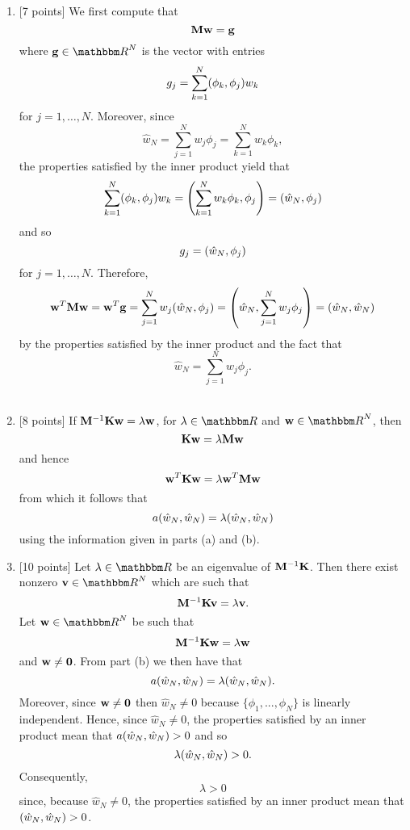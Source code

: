 \begin{solution}
\begin{enumerate}
\item {[7 points]} We first compute that
\[
{\bf M}{\bf w}={\bf g}
\]
where $\Bg\in\R^{N}$ is the vector with entries
\[
g_j=\sum_{k=1}^N(\phi_k,\phi_j)w_k
\]
for $j=1,\ldots,N$. Moreover, since
\[
\hat{w}_N=\sum_{j=1}^Nw_j\phi_j=\sum_{k=1}^Nw_k\phi_k,
\]
the properties satisfied by the inner product yield that
\[
\sum_{k=1}^N(\phi_k,\phi_j)w_k=\left(\sum_{k=1}^Nw_k\phi_k,\phi_j\right)=(\hat{w}_N,\phi_j)
\]
and so
\[
g_j=(\hat{w}_N,\phi_j)
\]
for $j=1,\ldots,N$. Therefore,
\[
{\bf w}^T{\bf M}{\bf w}={\bf w}^T{\bf g}=\sum_{j=1}^Nw_j(\hat{w}_N,\phi_j)=\left(\hat{w}_N,\sum_{j=1}^Nw_j\phi_j\right)=(\hat{w}_N,\hat{w}_N)
\]
by the properties satisfied by the inner product and the fact that
\[
\hat{w}_N=\sum_{j=1}^Nw_j\phi_j.
\]
\\
\item {[8 points]} If ${\bf M}^{-1}{\bf K}{\bf w}=\lambda{\bf w}$, for $\lambda\in\R$ and $\Bw\in\R^N$, then
\[
{\bf K}{\bf w}=\lambda{\bf M}{\bf w}
\]
and hence
\[
{\bf w}^T{\bf K}{\bf w}=\lambda{\bf w}^T{\bf M}{\bf w}
\]
from which it follows that
\[
a(\hat{w}_N,\hat{w}_N)=\lambda(\hat{w}_N,\hat{w}_N)
\]
using the information given in parts (a) and (b).
\\
\item {[10 points]} Let $\lambda\in\R$ be an eigenvalue of ${\bf M}^{-1}{\bf K}$. Then there exist nonzero $\Bv\in\R^N$ which are such that
\[
{\bf M}^{-1}{\bf K}{\bf v}=\lambda{\bf v}.
\]
Let $\Bw\in\R^N$ be such that
\[
{\bf M}^{-1}{\bf K}{\bf w}=\lambda{\bf w}
\]
and ${\bf w}\ne{\bf 0}$. From part (b) we then have that
\[
a(\hat{w}_N,\hat{w}_N)=\lambda(\hat{w}_N,\hat{w}_N).
\]
Moreover, since ${\bf w}\ne{\bf 0}$ then $\hat{w}_N\ne 0$ because $\{\phi_1,...,\phi_N\}$ is linearly independent. Hence, since $\hat{w}_N\ne 0$, the properties satisfied by an inner product mean that $a(\hat{w}_N,\hat{w}_N)>0$ and so
\[
\lambda(\hat{w}_N,\hat{w}_N)>0.
\]
Consequently, 
\[
\lambda>0
\]
since, because $\hat{w}_N\ne 0$, the properties satisfied by an inner product mean that $(\hat{w}_N,\hat{w}_N)>0$.
\end{enumerate}
\end{solution}